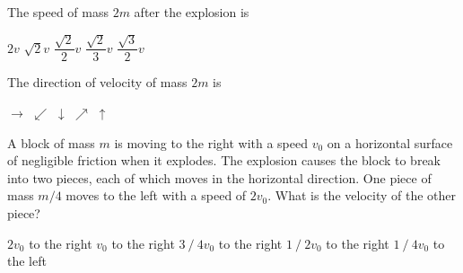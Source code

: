 \documentclass{../../../oss-ap12ibhl}
\begin{document}
\begin{questions}

  \question The speed of mass $2m$ after the explosion is
  \label{explode1}
  \begin{choices}
    \choice $2v$
    \choice $\displaystyle\sqrt2v$
    \choice $\dfrac{\sqrt2}2v$
    \choice $\dfrac{\sqrt2}3v$
    \choice $\dfrac{\sqrt3}2v$
  \end{choices}
  
  \question The direction of velocity of mass $2m$ is
  \label{explode2}
  \begin{choices}
    \choice $\rightarrow$
    \choice $\swarrow$
    \choice $\downarrow$
    \choice $\nearrow$
    \choice $\uparrow$
  \end{choices}
  
  \question A block of mass $m$ is moving to the right with a speed $v_0$ on a
  horizontal surface of negligible friction when it explodes. The explosion
  causes the block to break into two pieces, each of which moves in the
  horizontal direction. One piece of mass $m/4$ moves to the left with a speed
  of $2v_0$. What is the velocity of the other piece?
  \begin{choices}
    \choice$2v_0$ to the right
    \choice$v_0$ to the right
    \choice$3⁄4 v_0$ to the right
    \choice$1⁄2 v_0$ to the right
    \choice$1⁄4 v_0$ to the left
  \end{choices}


\end{questions}
\end{document}
